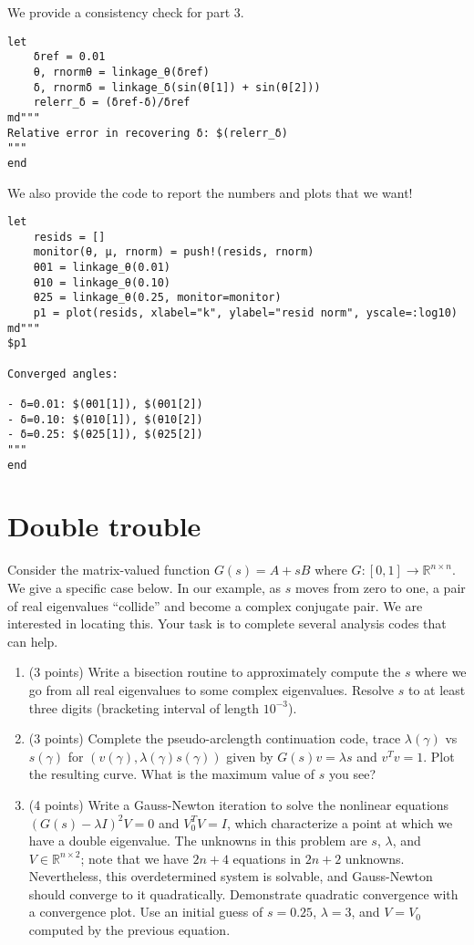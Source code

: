 \documentclass[12pt, leqno]{article} %
\providecommand{\tightlist}{%
  \setlength{\itemsep}{0pt}\setlength{\parskip}{0pt}}
\begin{document}
We provide a consistency check for part 3.

\begin{verbatim}
let
    δref = 0.01
    θ, rnormθ = linkage_θ(δref)
    δ, rnormδ = linkage_δ(sin(θ[1]) + sin(θ[2]))
    relerr_δ = (δref-δ)/δref
md"""
Relative error in recovering δ: $(relerr_δ)
"""
end
\end{verbatim}

We also provide the code to report the numbers and plots that we want!

\begin{verbatim}
let
    resids = []
    monitor(θ, μ, rnorm) = push!(resids, rnorm)
    θ01 = linkage_θ(0.01)
    θ10 = linkage_θ(0.10)
    θ25 = linkage_θ(0.25, monitor=monitor)
    p1 = plot(resids, xlabel="k", ylabel="resid norm", yscale=:log10)
md"""
$p1

Converged angles:

- δ=0.01: $(θ01[1]), $(θ01[2])
- δ=0.10: $(θ10[1]), $(θ10[2])
- δ=0.25: $(θ25[1]), $(θ25[2])
"""
end
\end{verbatim}


\section{Double trouble}

Consider the matrix-valued function \(G(s) = A+sB\) where
\(G : [0,1] \rightarrow \mathbb{R}^{n \times n}\). We give a specific
case below. In our example, as \(s\) moves from zero to one, a pair of
real eigenvalues ``collide'' and become a complex conjugate pair. We are
interested in locating this. Your task is to complete several analysis
codes that can help.

\begin{enumerate}
\def\labelenumi{\arabic{enumi}.}
\tightlist
\item
  (3 points) Write a bisection routine to approximately compute the
  \(s\) where we go from all real eigenvalues to some complex
  eigenvalues. Resolve \(s\) to at least three digits (bracketing
  interval of length \(10^{-3}\)).
\item
  (3 points) Complete the pseudo-arclength continuation code, trace
  \(\lambda(\gamma)\) vs \(s(\gamma)\) for
  \((v(\gamma), \lambda(\gamma) s(\gamma))\) given by
  \(G(s) v = \lambda s\) and \(v^T v = 1\). Plot the resulting curve.
  What is the maximum value of \(s\) you see?
\item
  (4 points) Write a Gauss-Newton iteration to solve the nonlinear
  equations \((G(s)-\lambda I)^2 V = 0\) and \(V_0^T V = I\), which
  characterize a point at which we have a double eigenvalue. The
  unknowns in this problem are \(s\), \(\lambda\), and
  \(V \in \mathbb{R}^{n \times 2}\); note that we have \(2n+4\)
  equations in \(2n+2\) unknowns. Nevertheless, this overdetermined
  system is solvable, and Gauss-Newton should converge to it
  quadratically. Demonstrate quadratic convergence with a convergence
  plot. Use an initial guess of \(s = 0.25\), \(\lambda = 3\), and
  \(V = V_0\) computed by the previous equation.
\end{enumerate}
\end{document}
